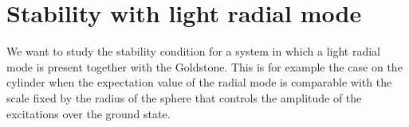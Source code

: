 \documentclass[11pt]{article}
\numberwithin{equation}{section}
\newcommand{\be}{\begin{equation}} \newcommand{\ee}{\end{equation}}
\begin{document}
%

\section{Stability with light radial mode}
\label{sec:two-field-stability}

We want to study the stability condition for a system in which a light radial mode is present together with the Goldstone.
This is for example the case on the cylinder when the expectation value of the radial mode is comparable with the scale fixed by the radius of the sphere that controls the amplitude of the excitations over the ground state.
\end{document}
